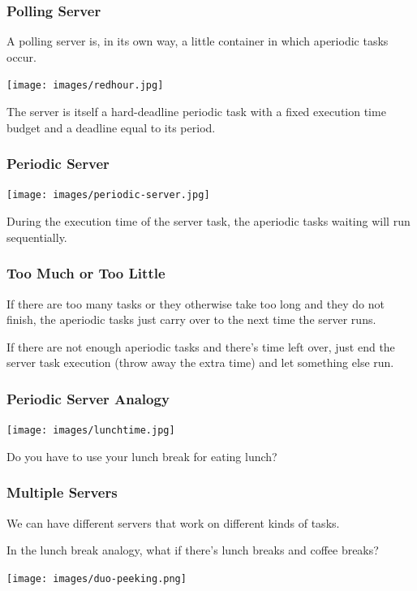 \begin{frame}
\frametitle{Polling Server}

A polling server is, in its own way, a little container in which aperiodic tasks occur.

\begin{center}
	\texttt{[image: images/redhour.jpg]}
\end{center}

The server is itself a hard-deadline periodic task with a fixed execution time budget and a deadline equal to its period.

\end{frame}

\begin{frame}
\frametitle{Periodic Server}

\begin{center}
	\texttt{[image: images/periodic-server.jpg]}
\end{center}

During the execution time of the server task, the aperiodic tasks waiting will run sequentially.

\end{frame}

\begin{frame}
\frametitle{Too Much or Too Little}

If there are too many tasks or they otherwise take too long and they do not finish, the aperiodic tasks just carry over to the next time the server runs. 

If there are not enough aperiodic tasks and there's time left over, just end the server task execution (throw away the extra time) and let something else run.

\end{frame}

\begin{frame}
\frametitle{Periodic Server Analogy}

\begin{center}
	\texttt{[image: images/lunchtime.jpg]}
\end{center}

Do you have to use your lunch break for eating lunch?

\end{frame}

\begin{frame}
\frametitle{Multiple Servers}

We can have different servers that work on different kinds of tasks.

In the lunch break analogy, what if there's lunch breaks and coffee breaks?

\hfill \texttt{[image: images/duo-peeking.png]}


\end{frame}

